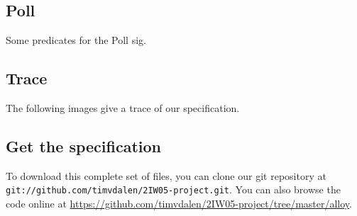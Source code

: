 		
		
	\subsection{Poll}
		Some predicates for the Poll sig.
		
		
		
\subsection{Trace}
	The following images give a trace of our specification.
	
\subsection{Get the specification}
	To download this complete set of files, you can clone our git repository at \texttt{git://github.com/timvdalen/2IW05-project.git}. You can also browse the code online at \url{https://github.com/timvdalen/2IW05-project/tree/master/alloy}.
